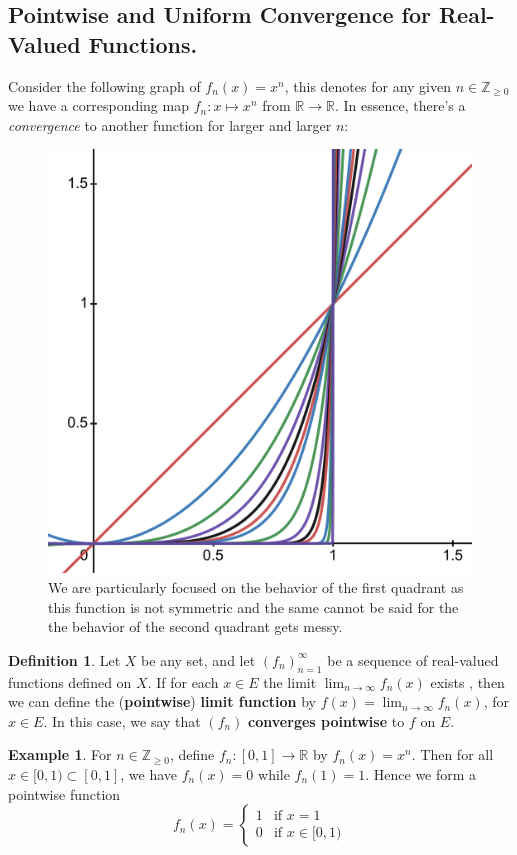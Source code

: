 \documentclass[oneside]{amsart}
\theoremstyle{definition}
\newtheorem{defi}{Definition}[section]
\newtheorem{ex}{Example}[section]
\newcommand{\rr}{\mathbb R}
\newcommand{\zz}{\mathbb Z}
\begin{document}
\subsection{Pointwise and Uniform Convergence for Real-Valued Functions.}
Consider the following graph of $f_n (x) = x^n$, this denotes for any given $n \in \zz_{\geq 0}$ we have a corresponding map $f_n : x \mapsto x^n$ from $\rr \to \rr$. In essence, there's a \textit{convergence} to another function for larger and larger $n$:
\begin{figure}[h!] \label{figure 1}
\includegraphics[scale=.3]{images/desmos-graph-3}
\caption{We are particularly focused on the behavior of the first quadrant as this function is not symmetric and the same cannot be said for the the behavior of the second quadrant gets messy.}
\end{figure}
\begin{defi}
Let $X$ be any set, and let $(f_n)_{n=1}^\infty$ be a sequence of real-valued functions defined on $X$. If for each $x \in E$ the limit $\lim_{n \to \infty} f_n(x)$ exists	, then we can define the (\textbf{pointwise}) \textbf{limit function} by $f(x) = \lim_{n \to \infty} f_n(x)$, for $x \in E$. In this case, we say that $(f_n)$ \textbf{converges pointwise} to $f$ on $E$.
\end{defi}
\begin{ex} \label{ex:1.1}
For $n \in \zz_{\geq 0}$, define $f_n \colon [0,1] \to \rr$ by $f_n(x) = x^n$.	Then for all $x \in [0,1) \subset [0,1]$, we have $f_n(x) =0$ while $f_n(1) = 1$. Hence we form a pointwise function 
\[
f_n(x) = \begin{cases}
	1 & \text{if $x = 1$}\\
	0 & \text{if $x \in [0,1)$}
\end{cases}
\]
\end{ex}
\end{document}
